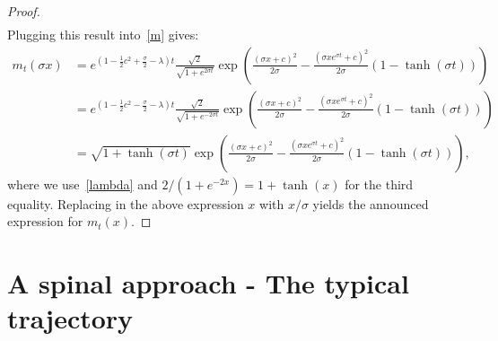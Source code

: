 \documentclass[AHL,Unicode,longabstracts,published]{cedram}
\begin{document}
\begin{proof}
\begin{align*}
\end{align*}
Plugging this result into~\eqref{m} gives:
\begin{align*}
m_{t}(\sigma x) &=e^{\left(1-\frac{1}{2}c^2+\frac{\sigma}{2}-\lambda\right)t}\frac{\sqrt{2}}{\sqrt{1+e^{2\sigma t}}}\exp\left(\frac{(\sigma x+c)^2}{2\sigma}-\frac{\left(\sigma xe^{\sigma t}+c \right)^2}{2\sigma}\left(1-\tanh(\sigma t)\right) \right)\\
 &= e^{\left(1-\frac{1}{2}c^2-\frac{\sigma}{2}-\lambda\right)t}\frac{\sqrt{2}}{\sqrt{1+e^{-2\sigma t}}}\exp\left(\frac{(\sigma x+c)^2}{2\sigma}-\frac{\left(\sigma xe^{\sigma t}+c \right)^2}{2\sigma}\left(1-\tanh(\sigma t)\right) \right)\\
&=\sqrt{1+\tanh(\sigma t)}\exp\left(\frac{(\sigma x+c)^2}{2\sigma}-\frac{\left(\sigma xe^{\sigma t}+c \right)^2}{2\sigma}\left(1-\tanh(\sigma t)\right) \right),
\end{align*}
where we use~\eqref{lambda} and $2/(1+e^{-2x})=1+\tanh(x)$ for the third equality. Replacing in the above expression $x$ with $x/\sigma$ yields the announced expression for $m_t(x)$.
\end{proof}

\section{A spinal approach - The typical trajectory}\label{sec:spinal}
\end{document}
